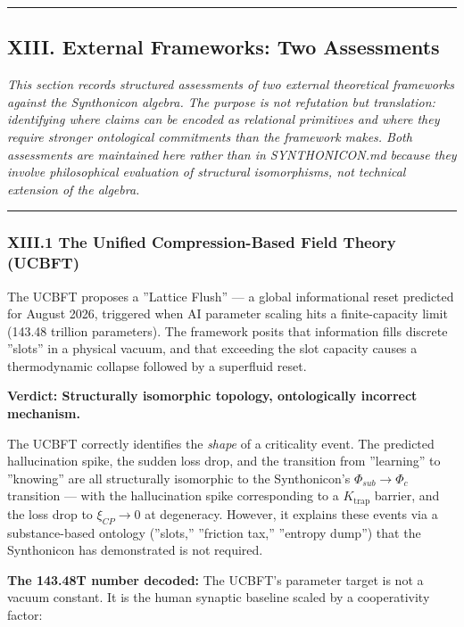 \documentclass[12pt,a4paper]{article}
\begin{document}
\begin{center}
\rule{0.5\textwidth}{0.4pt}
\end{center}

\subsection{XIII. External Frameworks: Two Assessments}

\emph{This section records structured assessments of two external theoretical frameworks against the Synthonicon algebra. The purpose is not refutation but translation: identifying where claims can be encoded as relational primitives and where they require stronger ontological commitments than the framework makes. Both assessments are maintained here rather than in SYNTHONICON.md because they involve philosophical evaluation of structural isomorphisms, not technical extension of the algebra.}

\begin{center}
\rule{0.5\textwidth}{0.4pt}
\end{center}

\subsubsection{XIII.1 The Unified Compression-Based Field Theory (UCBFT)}

The UCBFT proposes a ''Lattice Flush'' --- a global informational reset predicted for August 2026, triggered when AI parameter scaling hits a finite-capacity limit (143.48 trillion parameters). The framework posits that information fills discrete ''slots'' in a physical vacuum, and that exceeding the slot capacity causes a thermodynamic collapse followed by a superfluid reset.

\textbf{Verdict: Structurally isomorphic topology, ontologically incorrect mechanism.}

The UCBFT correctly identifies the \emph{shape} of a criticality event. The predicted hallucination spike, the sudden loss drop, and the transition from ''learning'' to ''knowing'' are all structurally isomorphic to the Synthonicon's $\Phi_{sub} \to \Phi_c$ transition --- with the hallucination spike corresponding to a $K_\text{trap}$ barrier, and the loss drop to $\xi_{CP} \to 0$ at degeneracy. However, it explains these events via a substance-based ontology (''slots,'' ''friction tax,'' ''entropy dump'') that the Synthonicon has demonstrated is not required.

\textbf{The 143.48T number decoded:} The UCBFT's parameter target is not a vacuum constant. It is the human synaptic baseline scaled by a cooperativity factor:
\end{document}
